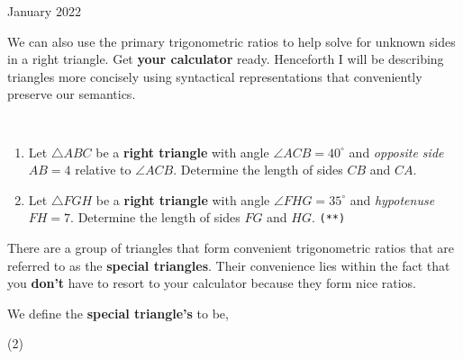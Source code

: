 \documentclass[12pt,oneside]{book} %
\begin{document}
\begin{lec}{January 2022}
\begin{ex}
\begin{tasks}

    \end{tasks}
  \end{ex}

  We can also use the primary trigonometric ratios to help solve for unknown sides in a right triangle. Get \textbf{
  your calculator} ready. Henceforth I will be describing triangles more concisely using syntactical representations
  that conveniently preserve our semantics.


  \begin{ex} \texttt{  }
    \begin{enumerate}[label=(\alph*)]
      \item Let $\triangle ABC$ be a \textbf{right triangle} with  angle $\angle ACB = 40^{\circ}$ and
        \textit{opposite side} $AB = 4$ relative to $\angle ACB$. Determine the length of sides $CB$ and $CA$.
      \item Let $\triangle FGH$ be a \textbf{right triangle} with angle $\angle FHG = 35^{\circ}$ and
        \textit{hypotenuse} $FH = 7$. Determine the length of sides $FG$ and $HG$. \hfill \texttt{(**)}
    \end{enumerate}
  \end{ex}

  There are a group of triangles that form convenient trigonometric ratios that are referred to as the \textbf{special
  triangles}. Their convenience lies within the fact that you \textbf{don't} have to resort to your calculator because
  they form nice ratios.

  \newpage

  \begin{thrm}
    We define the \textbf{special triangle's} to be,

    \begin{tasks}(2)
      \task \texttt{  }\\
\end{tasks}
\end{thrm}
\end{lec}
\end{document}
